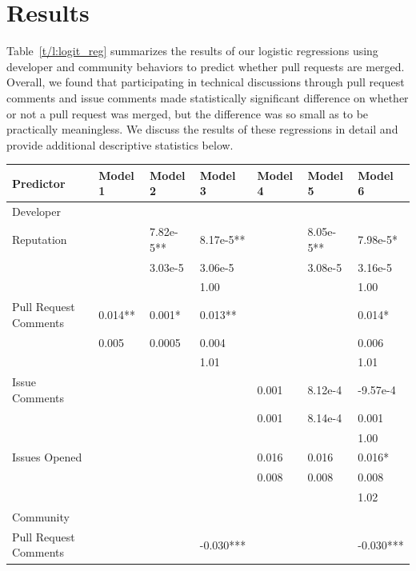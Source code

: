 \documentclass{sigchi}
\begin{document}
\section{Results} \label{chap:results}
Table~\ref{t/l:logit_reg} summarizes the results of our logistic regressions 
using developer and community behaviors to predict whether pull requests are 
merged. Overall, we found that participating in technical discussions through 
pull request comments and issue comments made statistically significant 
difference on whether or not a pull request was merged, but the difference was 
so small as to be practically meaningless. We discuss the results of these 
regressions in detail and provide additional descriptive statistics below.

\begin{table}[ht]
\centering
\begin{tabular}{lllllll}
\textbf{Predictor} & \textbf{Model 1} & \textbf{Model 2} & \textbf{Model 3} & 
\textbf{Model 4} & \textbf{Model 5} & \textbf{Model 6} \\ \hline
\multicolumn{7}{l}{Developer} \\
\-\hspace{1em}Reputation &  & 7.82e-5** & 8.17e-5** &  & 8.05e-5** & 7.98e-5* \\
 &  & 3.03e-5 & 3.06e-5 &  & 3.08e-5 & 3.16e-5 \\
 &  &  & 1.00 &  &  & 1.00 \\
\-\hspace{1em}Pull Request Comments & 0.014** & 0.001* & 0.013** &  &  & 0.014* 
\\
 & 0.005 & 0.0005 & 0.004 &  &  & 0.006 \\
 &  &  & 1.01 &  &  & 1.01 \\
\-\hspace{1em}Issue Comments &  &  &  & 0.001 & 8.12e-4 & -9.57e-4 \\
 &  &  &  & 0.001 & 8.14e-4 & 0.001 \\
 &  &  &  &  &  & 1.00 \\
\-\hspace{1em}Issues Opened &  &  &  & 0.016 & 0.016 & 0.016* \\
 &  &  &  & 0.008 & 0.008 & 0.008 \\
 &  &  &  &  &  & 1.02 \\
\multicolumn{7}{l}{Community} \\
\-\hspace{1em}Pull Request Comments &  &  & -0.030*** &  &  & -0.030*** \\

\end{tabular}
\end{table}
\end{document}
